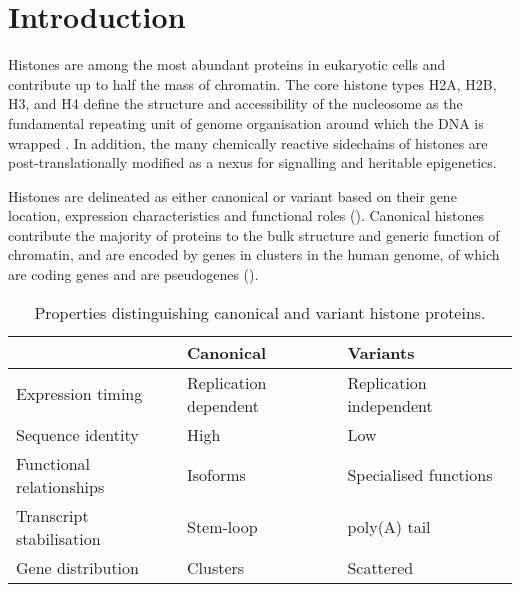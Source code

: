 \section{Introduction}

  Histones are among the most abundant proteins in eukaryotic cells
  and contribute up to half the mass of chromatin.
  The core histone types H2A, H2B, H3, and H4
  define the structure and accessibility of the nucleosome
  as the fundamental repeating unit of genome organisation
  around which the DNA is wrapped \citep{Luger1997structure}.
  In addition, the many chemically reactive sidechains of histones
  are post-translationally modified
  as a nexus for signalling and heritable epigenetics.

  Histones are delineated as either canonical or variant based on
  their gene location, expression characteristics
  and functional roles ().
  Canonical histones contribute the majority of proteins to
  the bulk structure and generic function of chromatin,
  and are encoded by \TotalGenes{} genes in \NumberOfClusters{}
  clusters in the human genome,
  of which \TotalCodingGenes{} are coding genes and \TotalPseudoGenes{}
  are pseudogenes ().

  \begin{table}
    \caption{Properties distinguishing canonical and variant histone proteins.}
    \label{tab:typical-histone-differences}
    \centering
    \begin{tabular}{l l l}
      \toprule
      \null                     & Canonical             & Variants \\
      \midrule
      Expression timing         & Replication dependent & Replication independent \\
      Sequence identity         & High                  & Low \\
      Functional relationships  & Isoforms              & Specialised functions \\
      Transcript stabilisation  & Stem-loop             & poly(A) tail \\
      Gene distribution         & Clusters              & Scattered \\
      \bottomrule
    \end{tabular}
  \end{table}

